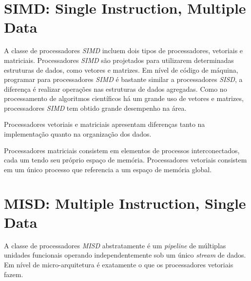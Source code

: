 \section{SIMD: Single Instruction, Multiple Data}

A classe de processadores \textit{SIMD} incluem dois tipos de
processadores, vetoriais e matriciais.
Processadores \textit{SIMD} são projetados para utilizarem determinadas
estruturas de dados, como vetores e matrizes. 
Em nível de código de máquina, programar para processadores \textit{SIMD} é 
bastante similar a processadores \textit{SISD}, a diferença é realizar operações
nas estruturas de dados agregadas. Como no processamento de algoritmos 
científicos há um grande uso de vetores e matrizes, processadores \textit{SIMD}
tem obtido grande desempenho na área.

Processadores vetoriais e matriciais apresentam diferenças tanto na 
implementação quanto na organização dos dados.

Processadores matriciais consistem em elementos de processos interconectados,
cada um tendo seu próprio espaço de memória. Processadores vetoriais consistem
em um único processo que referencia a um espaço de memória global.





\section{MISD: Multiple Instruction, Single Data}

A classe de processadores \textit{MISD} abstratamente é um
\textit{pipeline} de múltiplas unidades funcionais operando independentemente
sob um único \textit{stream} de dados. Em nível de micro-arquitetura é
exatamente o que os processadores vetoriais fazem.

